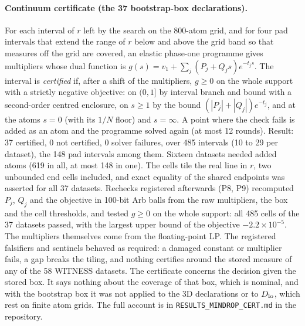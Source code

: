 \documentclass[aps,pre,twocolumn,superscriptaddress,nofootinbib,10pt]{revtex4-2}
\begin{document}
\paragraph*{Continuum certificate (the 37 bootstrap-box declarations).}
For each interval of $r$ left by the search on the 800-atom grid, and for four pad intervals that extend the range of $r$ below and above the grid band so that measures off the grid are covered, an elastic phase-one programme gives multipliers whose dual function is $g(s)=v_1+\sum_j(P_j+Q_js)e^{-t_js}$. The interval is \emph{certified} if, after a shift of the multipliers, $g\ge0$ on the whole support with a strictly negative objective: on $(0,1]$ by interval branch and bound with a second-order centred enclosure, on $s\ge1$ by the bound $(|P_j|+|Q_j|)e^{-t_j}$, and at the atoms $s=0$ (with its $1/N$ floor) and $s=\infty$. A point where the check fails is added as an atom and the programme solved again (at most 12 rounds). Result: 37 certified, 0 not certified, 0 solver failures, over 485 intervals (10 to 29 per dataset), the 148 pad intervals among them. Sixteen datasets needed added atoms (619 in all, at most 148 in one). The cells tile the real line in $r$, two unbounded end cells included, and exact equality of the shared endpoints was asserted for all 37 datasets. Rechecks registered afterwards (P8, P9) recomputed $P_j$, $Q_j$ and the objective in 100-bit Arb balls from the raw multipliers, the box and the cell thresholds, and tested $g\ge0$ on the whole support: all 485 cells of the 37 datasets passed, with the largest upper bound of the objective $-2.2\times10^{-5}$. The multipliers themselves come from the floating-point LP. The registered falsifiers and sentinels behaved as required: a damaged constant or multiplier fails, a gap breaks the tiling, and nothing certifies around the stored measure of any of the 58 WITNESS datasets. The certificate concerns the decision given the stored box. It says nothing about the coverage of that box, which is nominal, and with the bootstrap box it was not applied to the 3D declarations or to $D_{\rm lo}$, which rest on finite atom grids. The full account is in \texttt{RESULTS\_MINDROP\_CERT.md} in the repository.
\end{document}
